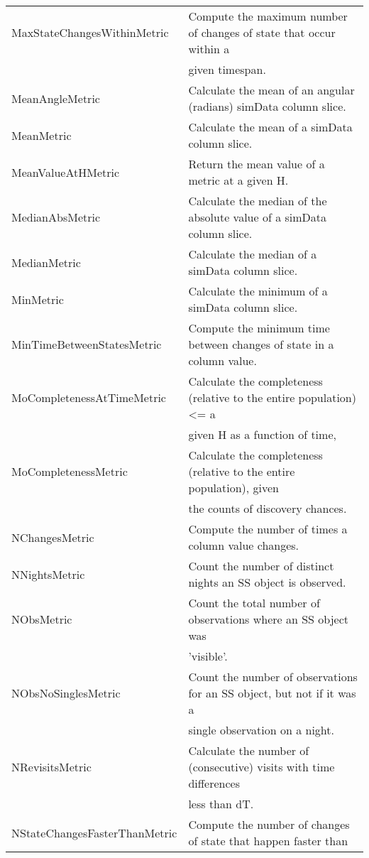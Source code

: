 \begin{table}
\begin{tabular}{ll}
 MaxStateChangesWithinMetric &  Compute the maximum number of changes of state that occur within a \\
  &  given timespan. \\
 MeanAngleMetric &  Calculate the mean of an angular (radians) simData column slice. \\
 MeanMetric &  Calculate the mean of a simData column slice. \\
 MeanValueAtHMetric &  Return the mean value of a metric at a given H. \\
 MedianAbsMetric &  Calculate the median of the absolute value of a simData column slice. \\
 MedianMetric &  Calculate the median of a simData column slice. \\
 MinMetric &  Calculate the minimum of a simData column slice. \\
 MinTimeBetweenStatesMetric &  Compute the minimum time between changes of state in a column value. \\
 MoCompletenessAtTimeMetric &  Calculate the completeness (relative to the entire population) <= a \\
  &  given H as a function of time, \\
 MoCompletenessMetric &  Calculate the completeness (relative to the entire population), given \\
  &  the counts of discovery chances. \\
 NChangesMetric &  Compute the number of times a column value changes. \\
 NNightsMetric &  Count the number of distinct nights an SS object is observed. \\
 NObsMetric &  Count the total number of observations where an SS object was \\
  &  'visible'. \\
 NObsNoSinglesMetric &  Count the number of observations for an SS object, but not if it was a \\
  &  single observation on a night. \\
 NRevisitsMetric &  Calculate the number of (consecutive) visits with time differences \\
  &  less than dT. \\
 NStateChangesFasterThanMetric &  Compute the number of changes of state that happen faster than \\
\hline
\end{tabular}

\end{table}
